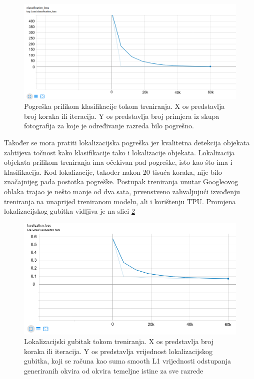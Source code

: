\begin{figure}[htb]
    \centering
    \includegraphics[width=12cm]{img/class-loss.png}
    \caption{Pogreška prilikom klasifikacije tokom treniranja. X os predstavlja broj koraka ili iteracija. Y os predstavlja 
    broj primjera iz skupa fotografija za koje je određivanje razreda bilo pogrešno.}
    \label{Class-Loss}
\end{figure}


Također se mora pratiti lokalizacijska pogreška jer kvalitetna detekcija objekata zahtijeva točnost kako klasifikacije
tako i lokalizacije objekata.
Lokalizacija objekata prilikom treniranja ima očekivan pad pogreške, isto kao što ima i klasifikacija. Kod lokalizacije, također nakon 20 tisuća koraka, nije bilo značajnijeg pada postotka pogreške. 
Postupak treniranja unutar Googleovog oblaka trajao je nešto manje od dva sata, prvenstveno zahvaljujući izvođenju treniranja na unaprijed treniranom modelu, ali i korištenju TPU. Promjena lokalizacijskog gubitka vidljiva je na slici \ref{Local-Loss} 

\begin{figure}[htb]
    \centering
    \includegraphics[width=12cm]{img/local-loss.png}
    \caption{Lokalizacijski gubitak tokom treniranja. X os predstavlja broj koraka ili iteracija. Y os predstavlja vrijednost lokalizacijskog gubitka, koji 
    se računa kao suma smooth L1 vrijednosti odstupanja generiranih okvira od okvira temeljne istine za sve razrede}
    \label{Local-Loss}
\end{figure}

